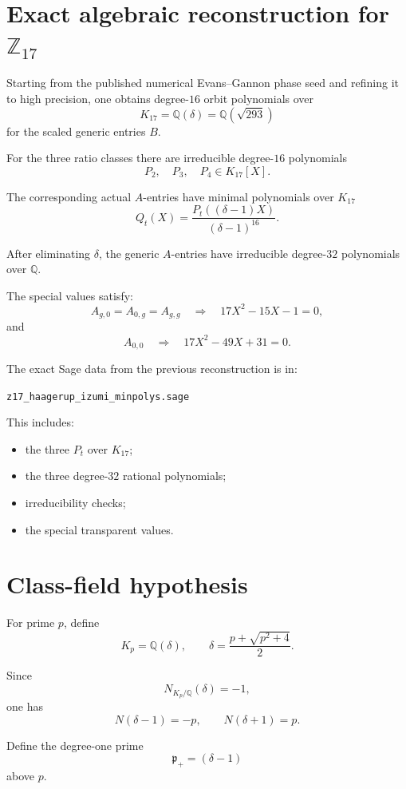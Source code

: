 \documentclass[11pt,reqno]{amsart}
\theoremstyle{plain}
\begin{document}
\section{\texorpdfstring{Exact algebraic reconstruction for \(\mathbb Z_{17}\)}{Exact algebraic reconstruction for Z17}}\label{sec:6}

Starting from the published numerical Evans--Gannon phase seed and refining it to high precision, one obtains degree-\(16\) orbit polynomials over
\[
K_{17}=\mathbb Q(\delta)
=
\mathbb Q(\sqrt{293})
\]
for the scaled generic entries \(B\).

For the three ratio classes there are irreducible degree-\(16\) polynomials
\[
P_2,\quad P_3,\quad P_4
\in K_{17}[X].
\]

The corresponding actual \(A\)-entries have minimal polynomials over \(K_{17}\)
\[
Q_t(X)
=
\frac{P_t((\delta-1)X)}{(\delta-1)^{16}}.
\]

After eliminating \(\delta\), the generic \(A\)-entries have irreducible degree-\(32\) polynomials over \(\mathbb Q\).

The special values satisfy:
\[
A_{g,0}=A_{0,g}=A_{g,g}
\quad\Longrightarrow\quad
17X^2-15X-1=0,
\]
and
\[
A_{0,0}
\quad\Longrightarrow\quad
17X^2-49X+31=0.
\]

The exact Sage data from the previous reconstruction is in:

\texttt{z17\_\allowbreak haagerup\_\allowbreak izumi\_\allowbreak minpolys.sage}

This includes:

\begin{itemize}
\item the three \(P_t\) over \(K_{17}\);
\item the three degree-\(32\) rational polynomials;
\item irreducibility checks;
\item the special transparent values.
\end{itemize}

\section{Class-field hypothesis}\label{sec:7}

For prime \(p\), define
\[
K_p
=
\mathbb Q(\delta),
\qquad
\delta=\frac{p+\sqrt{p^2+4}}2.
\]

Since
\[
N_{K_p/\mathbb Q}(\delta)=-1,
\]
one has
\[
N(\delta-1)=-p,
\qquad
N(\delta+1)=p.
\]

Define the degree-one prime
\[
\mathfrak p_+=(\delta-1)
\]
above \(p\).
\end{document}
